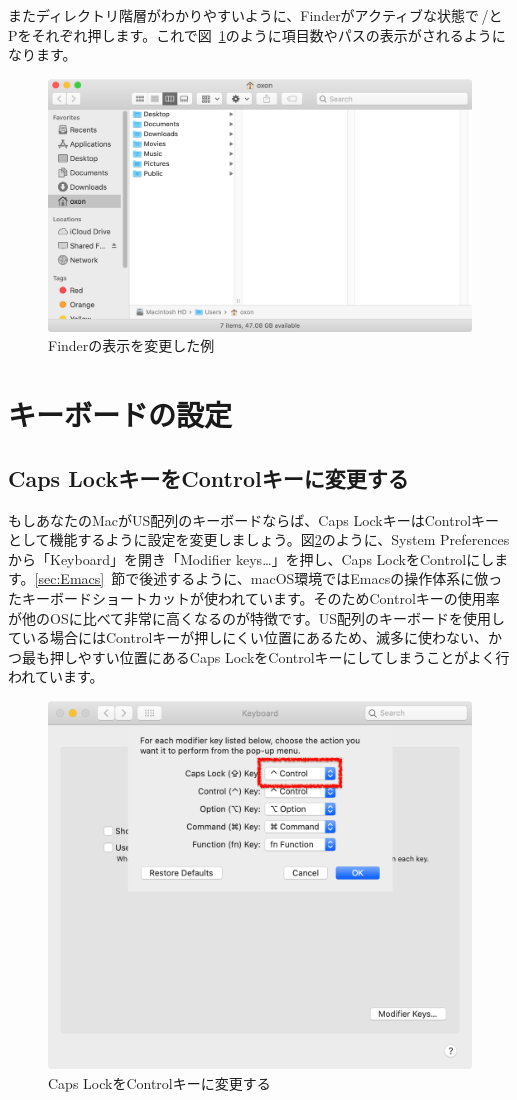 またディレクトリ階層がわかりやすいように、Finderがアクティブな状態で\cmdkey\,/と\cmdkey\,\optkey\,Pをそれぞれ押します。これで図~\ref{fig:Finder_info}のように項目数やパスの表示がされるようになります。

\begin{figure}
  \centering
  \includegraphics[width=.48\textwidth,clip]{fig/Finder_info.png}
  \caption{Finderの表示を変更した例}
\label{fig:Finder_info}
\end{figure}

\section{キーボードの設定}
\label{sec:Keyboard}

\subsection{Caps LockキーをControlキーに変更する}
もしあなたのMacがUS配列のキーボードならば、Caps LockキーはControlキーとして機能するように設定を変更しましょう。図\ref{fig:Keyboard1}のように、System Preferencesから「Keyboard」を開き「Modifier keys…」を押し、Caps LockをControlにします。\ref{sec:Emacs}~節で後述するように、macOS環境ではEmacsの操作体系に倣ったキーボードショートカットが使われています。そのためControlキーの使用率が他のOSに比べて非常に高くなるのが特徴です。US配列のキーボードを使用している場合にはControlキーが押しにくい位置にあるため、滅多に使わない、かつ最も押しやすい位置にあるCaps LockをControlキーにしてしまうことがよく行われています。

\begin{figure}
  \centering
  \includegraphics[scale=0.35]{fig/Keyboard1.png}
  \caption{Caps LockをControlキーに変更する}
  \label{fig:Keyboard1}
\end{figure}

